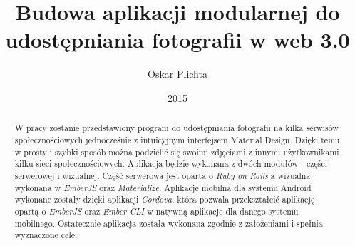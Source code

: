 \documentclass[brudnopis]{xmgr}
\author   {Oskar Plichta}
\title    {Budowa aplikacji modularnej do udostępniania fotografii  w web 3.0}
\date     {2015}
\begin{document}
\begin{abstract}

W pracy zostanie przedstawiony program do udostępniania fotografii na kilka serwisów społecznościowych jednocześnie z intuicyjnym interfejsem Material Design. Dzięki temu w prosty i szybki sposób można podzielić się swoimi zdjęciami z innymi użytkownikami kilku sieci społecznościowych. Aplikacja będzie wykonana z dwóch modułów - części serwerowej i wizualnej. Część serwerowa jest oparta o \textit{Ruby on Rails} a wizualna wykonana w \textit{EmberJS} oraz \textit{Materialize}. Aplikacje mobilna dla systemu Android wykonane zostały dzięki aplikacji \textit{Cordova}, która pozwala przekształcić aplikację opartą o \textit{EmberJS} oraz \textit{Ember CLI} w natywną aplikacje dla danego systemu mobilnego. Ostatecznie aplikacja została wykonana zgodnie z założeniami i spełnia wyznaczone cele.

\end{abstract}
\end{document}
